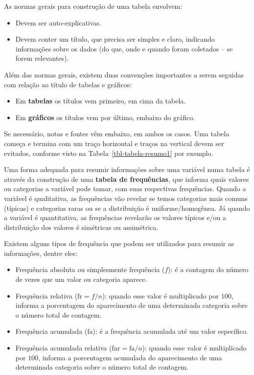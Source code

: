 \documentclass[
  12pt,
  letterpaper,
  DIV=11,
  numbers=noendperiod]{scrreprt}
\providecommand{\tightlist}{%
  \setlength{\itemsep}{0pt}\setlength{\parskip}{0pt}}\usepackage{longtable,booktabs,array}
\theoremstyle{definition}
\theoremstyle{exemplo}
\begin{document}
As normas gerais para construção de uma tabela envolvem:

\begin{itemize}
\tightlist
\item
  Devem ser auto-explicativas.
\item
  Devem conter um título, que precisa ser simples e claro, indicando
  informações sobre os dados (do que, onde e quando foram coletados --
  se forem relevantes).
\end{itemize}

Além das normas gerais, existem duas convenções importantes a serem
seguidas com relação ao título de tabelas e gráficos:

\begin{itemize}
\tightlist
\item
  Em \textbf{tabelas} os títulos vem primeiro, em cima da tabela.
\item
  Em \textbf{gráficos} os títulos vem por último, embaixo do gráfico.
\end{itemize}

Se necessário, notas e fontes vêm embaixo, em ambos os casos. Uma tabela
começa e termina com um traço horizontal e traços na vertical devem ser
evitados, conforme visto na Tabela~\ref{tbl-tabela-resumo1} por exemplo.

Uma forma adequada para resumir informações sobre uma variável numa
tabela é através da construção de uma \textbf{tabela de frequências},
que informa quais valores ou categorias a variável pode tomar, com suas
respectivas frequências. Quando a variável é qualitativa, as frequências
vão revelar se temos categorias mais comuns (típicas) e categorias raras
ou se a distribuição é uniforme/homogênea. Já quando a variável é
quantitativa, as frequências revelarão os valores típicos e/ou a
distribuição dos valores é simétricas ou assimétrica.

Existem alguns tipos de frequência que podem ser utilizados para resumir
as informações, dentre eles:

\begin{itemize}
\tightlist
\item
  Frequência absoluta ou simplesmente frequência (\(f\)): é a contagem
  do número de vezes que um valor ou categoria aparece.
\item
  Frequência relativa (\(\text{fr} = f/n\)): quando esse valor é
  multiplicado por \(100\), informa a porcentagem do aparecimento de uma
  determinada categoria sobre o número total de contagem.
\item
  Frequência acumulada (\(\text{fa}\)): é a frequência acumulada até um
  valor específico.
\item
  Frequência acumulada relativa (\(\text{far} = \text{fa}/n\)): quando
  esse valor é multiplicado por \(100\), informa a porcentagem acumulada
  do aparecimento de uma determinada categoria sobre o número total de
  contagem.
\end{itemize}
\end{document}

